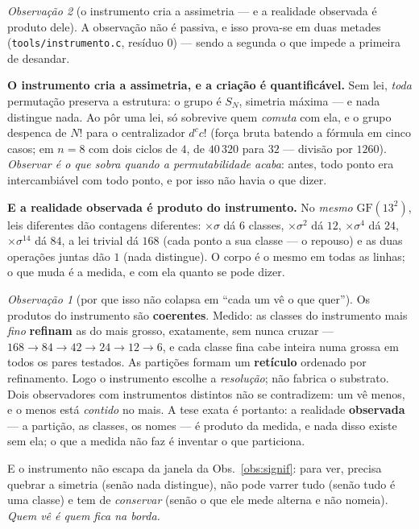 \documentclass[11pt]{article}
\newcommand{\code}[1]{\texttt{\small #1}}
\newcommand{\GF}{\mathrm{GF}}
\theoremstyle{plain}
\theoremstyle{remark}
\newtheorem{obs}{Observação}
\begin{document}
\begin{obs}[o instrumento cria a assimetria --- e a realidade observada é produto dele]\label{obs:instr}
A observação não é passiva, e isso prova-se em duas metades (\code{tools/instrumento.c}, resíduo $0$)
--- sendo a segunda o que impede a primeira de desandar.

\textbf{O instrumento cria a assimetria, e a criação é quantificável.} Sem lei, \emph{toda} permutação
preserva a estrutura: o grupo é $S_N$, simetria máxima --- e nada distingue nada. Ao pôr uma lei, só
sobrevive quem \emph{comuta} com ela, e o grupo despenca de $N!$ para o centralizador $d^c c!$ (força
bruta batendo a fórmula em cinco casos; em $n=8$ com dois ciclos de $4$, de $40\,320$ para $32$ ---
divisão por $1260$). \emph{Observar é o que sobra quando a permutabilidade acaba}: antes, todo ponto era
intercambiável com todo ponto, e por isso não havia o que dizer.

\textbf{E a realidade observada é produto do instrumento.} No \emph{mesmo} $\GF(13^2)$, leis diferentes
dão contagens diferentes: $\times\sigma$ dá $6$ classes, $\times\sigma^2$ dá $12$, $\times\sigma^4$ dá
$24$, $\times\sigma^{14}$ dá $84$, a lei trivial dá $168$ (cada ponto a sua classe --- o repouso) e as
duas operações juntas dão $1$ (nada distingue). O corpo é o mesmo em todas as linhas; o que muda é a
medida, e com ela quanto se pode dizer.

\begin{obs}[por que isso não colapsa em ``cada um vê o que quer'']
Os produtos do instrumento são \textbf{coerentes}. Medido: as classes do instrumento mais \emph{fino}
\textbf{refinam} as do mais grosso, exatamente, sem nunca cruzar --- $168\to84\to42\to24\to12\to6$, e
cada classe fina cabe inteira numa grossa em todos os pares testados. As partições formam um
\textbf{retículo} ordenado por refinamento. Logo o instrumento escolhe a \emph{resolução}; não fabrica
o substrato. Dois observadores com instrumentos distintos não se contradizem: um vê menos, e o menos
está \emph{contido} no mais. A tese exata é portanto: a realidade \textbf{observada} --- a partição, as
classes, os nomes --- é produto da medida, e nada disso existe sem ela; o que a medida não faz é
inventar o que particiona.

E o instrumento não escapa da janela da Obs.~\ref{obs:signif}: para ver, precisa quebrar a simetria
(senão nada distingue), não pode varrer tudo (senão tudo é uma classe) e tem de \emph{conservar} (senão
o que ele mede alterna e não nomeia). \emph{Quem vê é quem fica na borda.}
\end{obs}
\end{obs}
\end{document}
